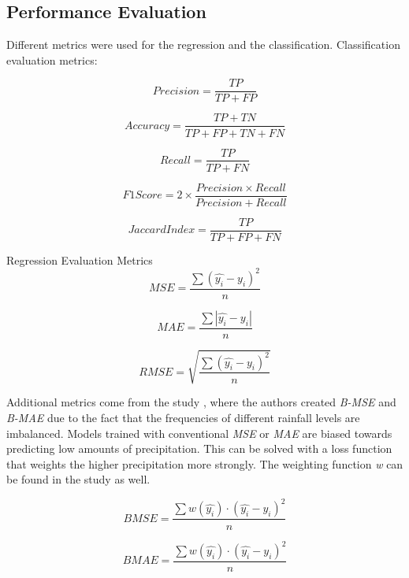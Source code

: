 \subsection{Performance Evaluation}

Different metrics were used for the regression and the classification.
Classification evaluation metrics:


\begin{equation}
  Precision = \frac{TP}{TP + FP}
\end{equation}

\begin{equation}
  Accuracy = \frac{TP+ TN}{TP + FP + TN + FN}
\end{equation}

\begin{equation}
  Recall = \frac{TP}{TP + FN}
\end{equation}

\begin{equation}
  F1Score = 2 \times \frac{Precision \times Recall}{Precision + Recall}
\end{equation}

\begin{equation}
  Jaccard Index = \frac{TP}{TP + FP + FN}
\end{equation}
\medskip

Regression Evaluation Metrics
\begin{equation}
  MSE = \frac{\sum (\hat{y_i} -y_i)^2}{n}
\end{equation}

\begin{equation}
MAE = \frac{\sum |\hat{y_i} -y_i|}{n}
\end{equation}

\begin{equation}
RMSE = \sqrt{\frac{\sum (\hat{y_i} -y_i)^2}{n}}
\end{equation}

Additional metrics come from the study \cite{shi2017deep}, where the authors created \textit{B-MSE} and \textit{B-MAE} due to the fact that the frequencies of different rainfall levels are imbalanced. Models trained with conventional \textit{MSE} or \textit{MAE} are biased towards predicting low amounts of precipitation. This can be solved with a loss function that weights the higher precipitation more strongly. The weighting function \textit{w} can be found in the study as well.

\begin{equation}
BMSE = \frac{\sum w(\hat{y_i}) \cdot (\hat{y_i} -y_i)^2}{n}
\end{equation}

\begin{equation}
BMAE = \frac{\sum w(\hat{y_i})  \cdot (\hat{y_i} -y_i)^2}{n}
\end{equation}
